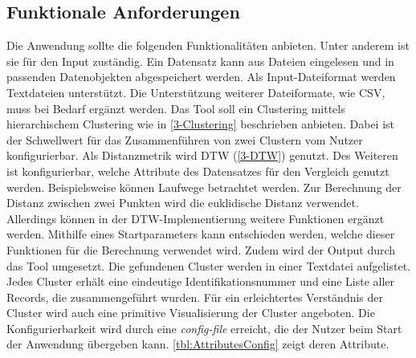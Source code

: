 \subsection{Funktionale Anforderungen}
\label{4-FunktionaleAnforderungen}
Die Anwendung sollte die folgenden Funktionalitäten anbieten.
Unter anderem ist sie für den Input zuständig.
Ein Datensatz kann aus Dateien eingelesen und in passenden Datenobjekten abgespeichert werden.
Als Input-Dateiformat werden Textdateien unterstützt.
Die Unterstützung weiterer Dateiformate, wie CSV, muss bei Bedarf ergänzt werden.
Das Tool soll ein Clustering mittels hierarchischem Clustering wie in \autoref{3-Clustering} beschrieben anbieten.
Dabei ist der Schwellwert für das Zusammenführen von zwei Clustern vom Nutzer konfigurierbar.
Als Distanzmetrik wird \ac{DTW} (\autoref{3-DTW}) genutzt.
Des Weiteren ist konfigurierbar, welche Attribute des Datensatzes für den Vergleich genutzt werden.
Beispielsweise können Laufwege betrachtet werden.
Zur Berechnung der Distanz zwischen zwei Punkten wird die euklidische Distanz verwendet.
Allerdings können in der \ac{DTW}-Implementierung weitere Funktionen ergänzt werden.
Mithilfe eines Startparameters kann entschieden werden, welche dieser Funktionen für die Berechnung verwendet wird.
Zudem wird der Output durch das Tool umgesetzt.
Die gefundenen Cluster werden in einer Textdatei aufgelistet.
Jedes Cluster erhält eine eindeutige Identifikationsnummer und eine Liste aller Records, die zusammengeführt wurden.
Für ein erleichtertes Verständnis der Cluster wird auch eine primitive Visualisierung der Cluster angeboten.
Die Konfigurierbarkeit wird durch eine \emph{config-file} erreicht,
die der Nutzer beim Start der Anwendung übergeben kann.
\autoref{tbl:AttributesConfig} zeigt deren Attribute.
